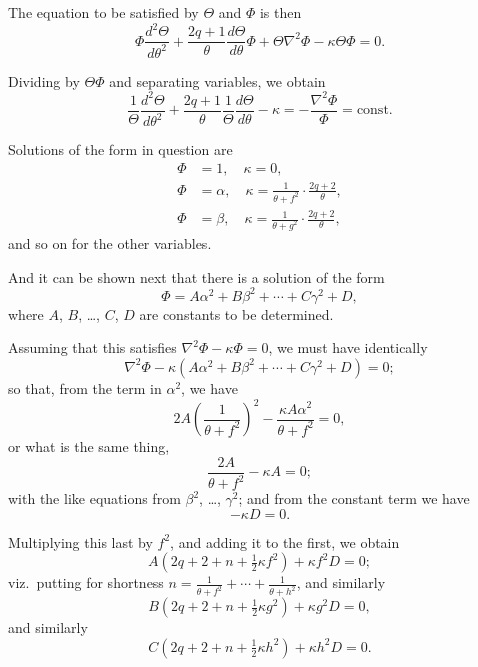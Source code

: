 \documentclass[11pt,a4paper]{book}
\begin{document}
\begin{art}\label{art:115}
The equation to be satisfied by $\Theta$ and $\Phi$ is then
\[
\Phi \frac{d^2\Theta}{d\theta^2} + \frac{2q+1}{\theta}\frac{d\Theta}{d\theta} \Phi + \Theta \nabla^2\Phi - \kappa\Theta\Phi = 0.
\]

Dividing by $\Theta\Phi$ and separating variables, we obtain
\[
\frac{1}{\Theta}\frac{d^2\Theta}{d\theta^2} + \frac{2q+1}{\theta}\frac{1}{\Theta}\frac{d\Theta}{d\theta} - \kappa = -\frac{\nabla^2\Phi}{\Phi} = \text{const.}
\]
\end{art}

\begin{art}\label{art:116}
Solutions of the form in question are
\begin{align*}
\Phi &= 1, \quad \kappa = 0, \\
\Phi &= \alpha, \quad \kappa = \frac{1}{\theta+f^2} \cdot \frac{2q+2}{\theta}, \\
\Phi &= \beta, \quad \kappa = \frac{1}{\theta+g^2} \cdot \frac{2q+2}{\theta},
\end{align*}
and so on for the other variables.
\end{art}

\begin{art}\label{art:117}
And it can be shown next that there is a solution of the form
\[
\Phi = A\alpha^2 + B\beta^2 + \cdots + C\gamma^2 + D,
\]
where $A$, $B$, \ldots, $C$, $D$ are constants to be determined.

Assuming that this satisfies $\nabla^2\Phi - \kappa\Phi = 0$, we must have identically
\[
\nabla^2\Phi - \kappa(A\alpha^2 + B\beta^2 + \cdots + C\gamma^2 + D) = 0;
\]
so that, from the term in $\alpha^2$, we have
\[
2A\left(\frac{1}{\theta+f^2}\right)^2 - \frac{\kappa A \alpha^2}{\theta+f^2} = 0,
\]
or what is the same thing,
\[
\frac{2A}{\theta+f^2} - \kappa A = 0;
\]
with the like equations from $\beta^2$, \ldots, $\gamma^2$; and from the constant term we have
\[
-\kappa D = 0.
\]
\end{art}

\begin{art}\label{art:118}
Multiplying this last by $f^2$, and adding it to the first, we obtain
\[
A(2q+2+n+\tfrac{1}{2}\kappa f^2) + \kappa f^2 D = 0;
\]
viz.\ putting for shortness $n = \frac{1}{\theta+f^2} + \cdots + \frac{1}{\theta+h^2}$, and similarly
\[
B(2q+2+n+\tfrac{1}{2}\kappa g^2) + \kappa g^2 D = 0,
\]
and similarly
\[
C(2q+2+n+\tfrac{1}{2}\kappa h^2) + \kappa h^2 D = 0.
\]
\end{art}
\end{document}
